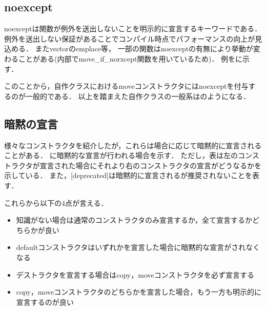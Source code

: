 
\subsection{noexcept}
noexceptは関数が例外を送出しないことを明示的に宣言するキーワードである．
例外を送出しない保証があることでコンパイル時点でパフォーマンスの向上が見込める．
またvectorのemplace等，
一部の関数はnoexceptの有無により挙動が変わることがある(内部でmove\_if\_norxcept関数を用いているため)．
例をに示す．

このことから，自作クラスにおけるmoveコンストラクタにはnoexceptを付与するのが一般的である．
以上を踏まえた自作クラスの一般系はのようになる．




\subsection{暗黙の宣言}
様々なコンストラクタを紹介したが，これらは場合に応じて暗黙的に宣言されることがある．
に暗黙的な宣言が行われる場合を示す．
ただし，表は左のコンストラクタが宣言された場合にそれより右のコンストラクタの宣言がどうなるかを示している．
また，[deprecated]は暗黙的に宣言されるが推奨されないことを表す．

これらから以下の4点が言える．
\begin{itemize}
  \item 知識がない場合は通常のコンストラクタのみ宣言するか，全て宣言するかどちらかが良い
  \item defaultコンストラクタはいずれかを宣言した場合に暗黙的な宣言がされなくなる
  \item デストラクタを宣言する場合はcopy，moveコンストラクタを必ず宣言する
  \item copy，moveコンストラクタのどちらかを宣言した場合，もう一方も明示的に宣言するのが良い
\end{itemize}

